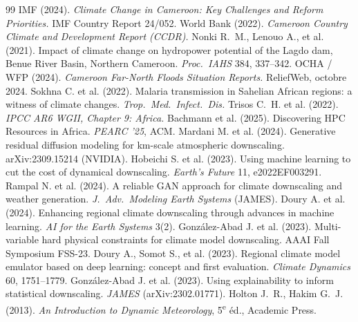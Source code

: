 \documentclass[12pt,a4paper]{article}
\begin{document}
\small
\renewcommand{\refname}{Sources}
\begin{thebibliography}{99}
    \setlength{\itemsep}{2pt}
     IMF (2024). \emph{Climate Change in Cameroon: Key Challenges and Reform Priorities.} IMF Country Report 24/052.
     World Bank (2022). \emph{Cameroon Country Climate and Development Report (CCDR).}
     Nonki R.~M., Lenouo A., et al. (2021). Impact of climate change on hydropower potential of the Lagdo dam, Benue River Basin, Northern Cameroon. \emph{Proc.~IAHS} 384, 337--342.
     OCHA / WFP (2024). \emph{Cameroon Far-North Floods Situation Reports.} ReliefWeb, octobre 2024.
     Sokhna C. et al. (2022). Malaria transmission in Sahelian African regions: a witness of climate changes. \emph{Trop.~Med.~Infect.~Dis.}
     Trisos C.~H. et al. (2022). \emph{IPCC AR6 WGII, Chapter 9: Africa.}
     Bachmann et al. (2025). Discovering HPC Resources in Africa. \emph{PEARC '25}, ACM.
     Mardani M. et al. (2024). Generative residual diffusion modeling for km-scale atmospheric downscaling. arXiv:2309.15214 (NVIDIA).
     Hobeichi S. et al. (2023). Using machine learning to cut the cost of dynamical downscaling. \emph{Earth's Future} 11, e2022EF003291.
     Rampal N. et al. (2024). A reliable GAN approach for climate downscaling and weather generation. \emph{J.~Adv.~Modeling Earth Systems} (JAMES).
     Doury A. et al. (2024). Enhancing regional climate downscaling through advances in machine learning. \emph{AI for the Earth Systems} 3(2).
     González-Abad J. et al. (2023). Multi-variable hard physical constraints for climate model downscaling. AAAI Fall Symposium FSS-23.
     Doury A., Somot S., et al. (2023). Regional climate model emulator based on deep learning: concept and first evaluation. \emph{Climate Dynamics} 60, 1751--1779.
     González-Abad J. et al. (2023). Using explainability to inform statistical downscaling. \emph{JAMES} (arXiv:2302.01771).
     Holton J.~R., Hakim G.~J. (2013). \emph{An Introduction to Dynamic Meteorology}, 5\textsuperscript{e} éd., Academic Press.
\end{thebibliography}
\end{document}
